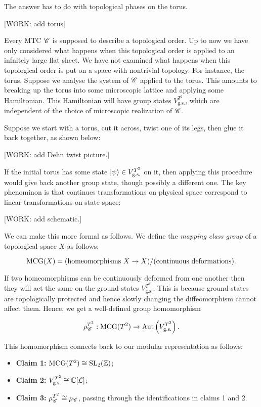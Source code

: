 The answer has to do with topological phases on the torus.

[WORK: add torus]

Every MTC $\mathscr{C}$ is supposed to describe a topological order. Up to now we have only considered what happens when this topological order is applied to an infnitely large flat sheet. We have not examined what happens when this topological order is put on a space with nontrivial topology. For instance, the torus. Suppose we analyse the system of $\mathscr{C}$ applied to the torus. This amounts to breaking up the torus into some microscopic lattice and applying some Hamiltonian. This Hamiltonian will have group states $V_{\text{g.s.}}^{T^2}$, which are independent of the choice of microscopic realization of $\mathscr{C}$.

Suppose we start with a torus, cut it across, twist one of its legs, then glue it back together, as shown below:

[WORK: add Dehn twist picture.]

If the initial torus has some state $\ket{\psi}\in V_{\text{g.s.}}^{T^2}$ on it, then applying this procedure would give back another group state, though possibly a different one. The key phenominon is that continues transformations on physical space correspond to linear transformations on state space:

[WORK: add schematic.]

We can make this more formal as follows. We define the \textit{mapping class group} of a topological space $X$ as follows:

$$\operatorname{MCG}(X)=(\text{homeomorphisms $X\to X$})/(\text{continuous deformations}).$$

If two homeomorphisms can be continuously deformed from one another then they will act the same on the ground states $V_{\text{g.s.}}^{T^2}$. This is because ground states are topologically protected and hence slowly changing the diffeomorphism cannot affect them. Hence, we get a well-defined group homomorphism

$$\rho_{\mathscr{C}}^{T^2}:\operatorname{MCG}(T^2)\xrightarrow{}\operatorname{Aut}\left(V_{\text{g.s.}}^{T^2}\right).$$

This homomorphism connects back to our modular representation as follows:

\begin{itemize}
\item \textbf{Claim 1:} $\operatorname{MCG}(T^2)\cong \operatorname{SL}_2(\mathbb{Z})$;

\item \textbf{Claim 2:} $V_{\text{g.s.}}^{T^2}\cong \mathbb{C}[\mathcal{L}]$;

\item \textbf{Claim 3:} $\rho_{\mathscr{C}}^{T^2}\cong \rho_{\mathscr{C}}$, passing through the identifications in claims 1 and 2.
\end{itemize}

